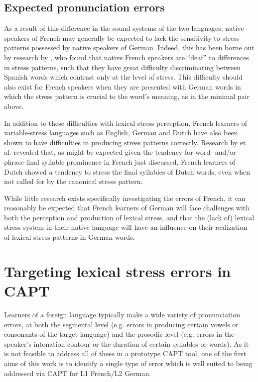 			
		\subsection{Expected pronunciation errors}
		\label{sec:stress:expected}
		As a result of this difference in the sound systems of the two languages,
		native speakers of French may generally be expected to lack the sensitivity to stress patterns possessed by native speakers of German. Indeed, this has been borne out by research by \textcite{Dupoux2008},
  who found that native French speakers are ``deaf'' to differences in stress patterns, such that they have great difficulty discriminating between Spanish words which contrast only at the level of stress. This difficulty should also exist for French speakers when they are presented with German words in which the stress pattern is crucial to the word's meaning, as in the minimal pair above. 
  
  In addition to these difficulties with lexical stress perception, French learners of variable-stress languages such as English, German and Dutch have also been shown to have difficulties in producing stress patterns correctly. Research by \citeauthor{Michaux2012} et al. \citeyear{Michaux2012,Michaux2013} revealed that, as might be expected given the tendency for word- and/or phrase-final syllable prominence in French just discussed, French learners of Dutch  showed a tendency to stress the final syllables of Dutch words, even when not called for by the canonical stress pattern.
  
 While little research exists specifically investigating the errors of French, it can reasonably be expected that French learners of German will face challenges with both the perception and production of lexical stress, and that the (lack of) lexical stress system in their native language will have an influence on their realization of lexical stress patterns in German words.

		
		
 \section{Targeting lexical stress errors in CAPT}
 \label{sec:bkgd:targeting}
 	Learners of a foreign language typically make a wide variety of pronunciation errors, at both the segmental level (e.g. errors in producing certain vowels or consonants of the target language) and the prosodic level (e.g. errors in the speaker's intonation contour or the duration of certain syllables or words). 
 As it is not feasible to address all of these in a prototype CAPT tool, 
one of the first aims of this work is to identify a single type of error which is well suited to being addressed via CAPT for L1 French/L2 German.
	

